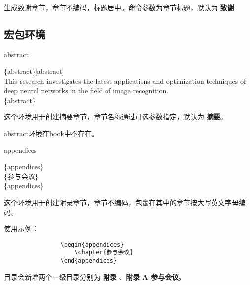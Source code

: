 \documentclass{ctxdoc}
\begin{document}
    \begin{function}[added=2024-08-18]{\acknowledgments}
        \begin{syntax}
            \\
        \end{syntax}
        生成致谢章节，章节不编码，标题居中。命令参数为章节标题，默认为 \textbf{致谢}
    \end{function}

    \subsection{宏包环境}

    \begin{environment}{abstract}
        \begin{syntax}
            \{abstract\}[abstract] \\
            This research investigates the latest applications and optimization techniques
            of deep neural networks in the field of image recognition. \\
            \{abstract\}
        \end{syntax}
        这个环境用于创建摘要章节，章节名称通过可选参数指定，默认为 \textbf{摘要}。
        \begin{texnote}
            abstract环境在book中不存在。
        \end{texnote}
    \end{environment}


    \begin{environment}{appendices}
        \begin{syntax}
            \{appendices\} \\
            \{参与会议\} \\
            \{appendices\}
        \end{syntax}
        这个环境用于创建附录章节，章节不编码，包裹在其中的章节按大写英文字母编码。

        \begin{texnote}
            使用示例：
            \begin{verbatim}
                \begin{appendices}
                    \chapter{参与会议}
                \end{appendices}
            \end{verbatim}

            目录会新增两个一级目录分别为 \textbf{附录} 、\textbf{附录 A 参与会议}。

        \end{texnote}

    \end{environment}
\end{document}
